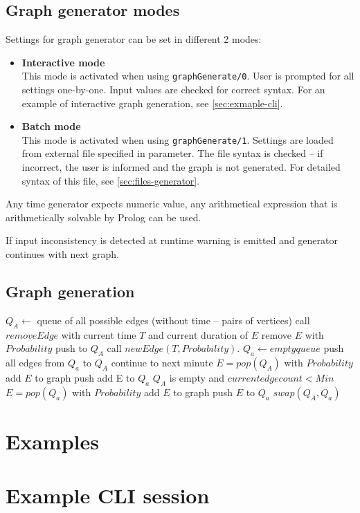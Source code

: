\documentclass[11pt, a4paper,draft]{article}
\newcommand{\pl}[1]{\texttt{#1}} %
\theoremstyle{plain}
\theoremstyle{definition}
\theoremstyle{remark}
\begin{document}
\subsection{Graph generator modes}
\label{sec:generator-modes}
Settings for graph generator can be set in different 2 modes:
\begin{itemize}
\item \textbf{Interactive mode} \\
This mode is activated when using \pl{graphGenerate/0}. 
User is prompted for all settings one-by-one. Input values are checked for correct syntax. 
For an example of interactive graph generation, see \autoref{sec:exmaple-cli}.
\item \textbf{Batch mode} \\
This mode is activated when using \pl{graphGenerate/1}. 
Settings are loaded from external file specified in parameter. 
The file syntax is checked -- if incorrect, the user is informed and the graph is not generated. 
For detailed syntax of this file, see \autoref{sec:files-generator}.
\end{itemize}

Any time generator expects numeric value, any arithmetical expression
that is arithmetically solvable by Prolog can be used.

If input inconsistency is detected at runtime warning is emitted and generator
continues with next graph.

\subsection{Graph generation}
\label{sec:generator-generation}

\begin{algorithmic}[1]
    \State $Q_A \leftarrow$ queue of all possible edges (without time -- pairs of vertices)
            \State call $removeEdge$ with current time $T$ and current duration of $E$
            \State remove $E$ with $Probability$
             push to $Q_A$ \EndIf
        \EndFor
        \State call $newEdge( T, Probability )$.
        \State $Q_a \leftarrow empty queue$
                \State push all edges from $Q_a$ to $Q_A$
                \State continue to next minute
            \EndIf
            \State $E = pop( Q_A )$
            \State with $Probability$ add $E$ to graph
             push add E to $Q_a$ \EndIf
            \If $Q_A$ is empty and $current edge count < Min$
                    \State $E = pop( Q_a )$
                    \State with $Probability$ add $E$ to graph
                     push $E$ to $Q_a$ \EndIf
                \EndWhile
            \EndIf
        \EndWhile
        \State $swap( Q_A, Q_a )$ 
    \EndFor
\end{algorithmic}

\section{Examples}
\section{Example CLI session}
\label{sec:exmaple-cli}

\end{document}
